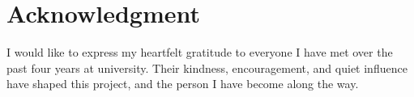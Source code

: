 \section*{Acknowledgment}
 {}
\vspace{-1em}
{\fontsize{12pt}{18pt}\selectfont 

I would like to express my heartfelt gratitude to everyone I have met over the past four years at university. 
Their kindness, encouragement, and quiet influence have shaped this project, and the person I have become along the way.

}
